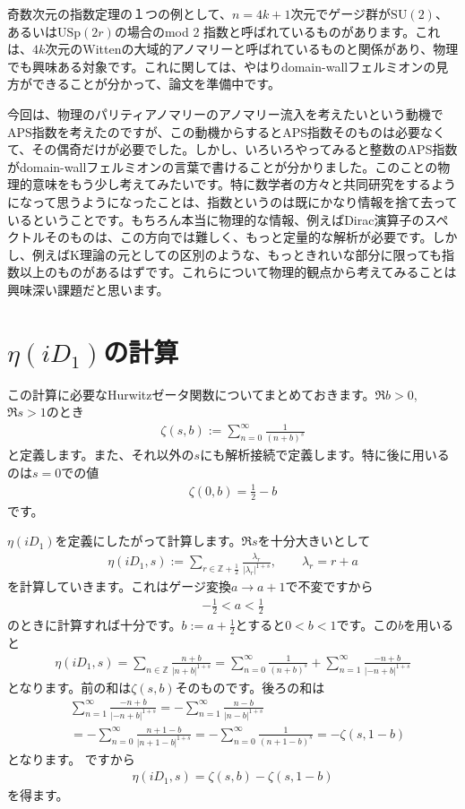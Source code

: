 \documentclass[paper=a4, fontsize=12pt, line_length=16cm, number_of_lines=33,dvipdfmx]{jlreq}
\numberwithin{equation}{section}
\newcommand{\Zb}{\mathbb{Z}}
\newcommand{\halfint}{\Zb+\frac{1}{2}}
\begin{document}
奇数次元の指数定理の１つの例として、$n=4k+1$次元でゲージ群が$\mathrm{SU}(2)$、あるいは$\mathrm{USp}(2r)$の場合のmod 2 指数と呼ばれているものがあります。これは、$4k$次元のWittenの大域的アノマリーと呼ばれているものと関係があり、物理でも興味ある対象です。これに関しては、やはりdomain-wallフェルミオンの見方ができることが分かって、論文を準備中です\cite{Fukaya:2020abc}。

今回は、物理のパリティアノマリーのアノマリー流入を考えたいという動機でAPS指数を考えたのですが、この動機からするとAPS指数そのものは必要なくて、その偶奇だけが必要でした。しかし、いろいろやってみると整数のAPS指数がdomain-wallフェルミオンの言葉で書けることが分かりました。このことの物理的意味をもう少し考えてみたいです。特に数学者の方々と共同研究をするようになって思うようになったことは、指数というのは既にかなり情報を捨て去っているということです。もちろん本当に物理的な情報、例えばDirac演算子のスペクトルそのものは、この方向では難しく、もっと定量的な解析が必要です。しかし、例えばK理論の元としての区別のような、もっときれいな部分に限っても指数以上のものがあるはずです。これらについて物理的観点から考えてみることは興味深い課題だと思います。

\appendix
\section{$\eta(iD_1)$の計算}\label{app:calceta}
この計算に必要なHurwitzゼータ関数についてまとめておきます。$\Re b>0$, $\Re s >1$のとき
\begin{align}
  \zeta(s,b):=\sum_{n=0}^{\infty}\frac{1}{(n+b)^s}
\end{align}
と定義します。また、それ以外の$s$にも解析接続で定義します。特に後に用いるのは$s=0$での値
\begin{align}
  \zeta(0,b)=\frac12-b\label{zeta0}
\end{align}
です。

$\eta(iD_1)$を定義にしたがって計算します。$\Re s$を十分大きいとして
\begin{align}
  \eta(iD_1,s):=\sum_{r\in \halfint}\frac{\lambda_{r}}{|\lambda_r|^{1+s}},\qquad \lambda_{r}=r+a
\end{align}
を計算していきます。これはゲージ変換$a\to a+1$で不変ですから
\begin{align}
  -\frac12 <a <\frac12
\end{align}
のときに計算すれば十分です。$b:=a+\frac12$とすると$0<b<1$です。この$b$を用いると
\begin{align}
  \eta(iD_1,s)=\sum_{n\in\Zb} \frac{n+b}{|n+b|^{1+s}}
  =\sum_{n=0}^{\infty}\frac{1}{(n+b)^s}+\sum_{n=1}^{\infty}\frac{-n+b}{|-n+b|^{1+s}}
\end{align}
となります。前の和は$\zeta(s,b)$そのものです。後ろの和は
\begin{align}
  &\sum_{n=1}^{\infty}\frac{-n+b}{|-n+b|^{1+s}}
  =-\sum_{n=1}^{\infty}\frac{n-b}{|n-b|^{1+s}}\nonumber\\
  &=-\sum_{n=0}^{\infty}\frac{n+1-b}{|n+1-b|^{1+s}}
  =-\sum_{n=0}^{\infty}\frac{1}{(n+1-b)^{s}}
  =-\zeta(s,1-b)
\end{align}
となります。
ですから
\begin{align}
  \eta(iD_1,s)=\zeta(s,b)-\zeta(s,1-b)
\end{align}
を得ます。
\end{document}
